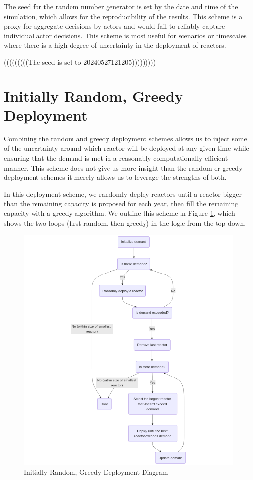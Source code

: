 The seed for the random number generator is set by the date and time of the
simulation, which allows for the reproducibility of the results. This scheme is
a proxy for aggregate decisions by actors and would fail to reliably capture
individual actor decisions. This scheme is most useful for scenarios or
timescales where there is a high degree of uncertainty in the deployment of
reactors.

(((((((((The seed is set to 20240527121205)))))))))


\section{Initially Random, Greedy Deployment}
\label{sec:initially_random_greedy}

Combining the random and greedy deployment schemes allows us to inject some of
the uncertainty around which reactor will be deployed at any given time while
ensuring that the demand is met in a reasonably computationally efficient
manner. This scheme does not give us more insight than the random or greedy
deployment schemes it merely allows us to leverage the strengths of both.

In this deployment scheme, we randomly deploy reactors until a reactor bigger
than the remaining capacity is proposed for each year, then fill the remaining
capacity with a greedy algorithm. We outline this scheme in Figure
\ref{fig:init_random_greedy_diagram}, which shows the two loops (first random,
then greedy) in the logic from the top down.

\begin{figure}[!htbp]
    \centering
    \includegraphics[scale=0.7]{images/schemes/random_greedy_diagram.png}
    \caption{Initially Random, Greedy Deployment Diagram}
    \label{fig:init_random_greedy_diagram}
\end{figure}

